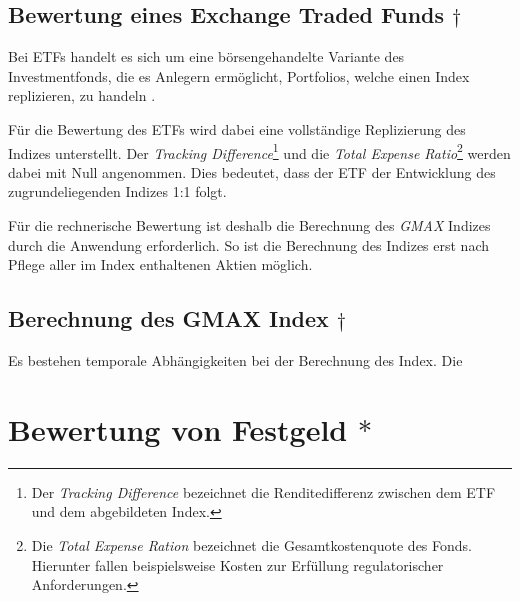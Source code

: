\documentclass[12pt, a4paper]{article}
\begin{document}

\subsection{Bewertung eines Exchange Traded Funds $\dagger$}
\label{sec:bewertung_eines_exchange_traded_funds}
Bei {ETFs} handelt es sich um eine börsengehandelte Variante des Investmentfonds, die es Anlegern ermöglicht, Portfolios, welche einen Index replizieren, zu handeln \autocite[][S.~103]{bodie_investments_2018}. 

Für die Bewertung des ETFs wird dabei eine vollständige Replizierung des Indizes unterstellt.
Der \textit{Tracking Difference}\footnote{Der \textit{Tracking Difference} bezeichnet die Renditedifferenz zwischen dem ETF und dem abgebildeten Index.} und die \textit{Total Expense Ratio}\footnote{Die \textit{Total Expense Ration} bezeichnet die Gesamtkostenquote des Fonds. Hierunter fallen beispielsweise Kosten zur Erfüllung regulatorischer Anforderungen.} werden dabei mit Null angenommen.
Dies bedeutet, dass der ETF der Entwicklung des zugrundeliegenden Indizes 1:1 folgt.


Für die rechnerische Bewertung ist deshalb die Berechnung des \textit{GMAX} Indizes durch die Anwendung erforderlich. So ist die Berechnung des Indizes erst nach Pflege aller im Index enthaltenen Aktien möglich.

\subsection{Berechnung des {GMAX} Index $\dagger$}

Es bestehen temporale Abhängigkeiten bei der Berechnung des Index. Die 



\section{Bewertung von Festgeld $\ast$}
\label{sec:bewertung_von_festgeldern}
\end{document}
